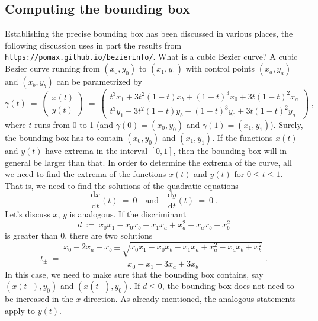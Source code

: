 \documentclass{article}
\begin{document}
\clearpage
\subsection*{Computing the bounding box}

Establishing the precise bounding box has been discussed in various places, the
following discussion uses in part the results from
\texttt{https://pomax.github.io/bezierinfo/}. What is a cubic Bezier curve? A
cubic Bezier curve running from $(x_0,y_0)$ to $(x_1,y_1)$ with control points
$(x_a,y_a)$ and $(x_b,y_b)$ can be parametrized by
\begin{equation}
 \gamma(t)~=~
 \begin{pmatrix} x(t)\\ y(t) \end{pmatrix}~=~
 \begin{pmatrix}t^3 x_{1}+3 t^2 (1-t) x_{b}+(1-t)^3
   x_{0}+3 t (1-t)^2 x_{a}\\
   t^3 y_{1}+3
   t^2 (1-t) y_{b}+(1-t)^3 y_{0}+3 t (1-t)^2
   y_{a}\end{pmatrix}\;,
\end{equation}
where $t$ runs from 0 to 1 (and $\gamma(0)=(x_0,y_0)$ and
$\gamma(1)=(x_1,y_1)$). Surely, the bounding box has to contain
$(x_0,y_0)$ and $(x_1,y_1)$. If the functions $x(t)$ and $y(t)$ have extrema in
the interval $[0,1]$, then the bounding box will in general be larger than that.
In order to determine the extrema of the curve, all
we need to find the extrema of the functions $x(t)$ and $y(t)$ for $0\le t\le
1$. That is, we need to find the solutions of the quadratic equations
\begin{equation}
 \frac{\mathrm{d}x}{\mathrm{d}t}(t)~=~0\quad\text{and}\quad
 \frac{\mathrm{d}y}{\mathrm{d}t}(t)~=~0\;.
\end{equation}
Let's discuss $x$, $y$ is analogous. If the discriminant
\begin{equation}
 d~:=~x_{0} x_{1}-x_{0}
   x_{b}-x_{1}
   x_{a}+x_{a}^2-x_{a}
   x_{b}+x_{b}^2
\end{equation}
is greater than 0, there are two solutions
\begin{equation}
 t_\pm~=~\frac{x_{0}-2
   x_{a}+x_{b}\pm\sqrt{x_{0} x_{1}-x_{0}
   x_{b}-x_{1}
   x_{a}+x_{a}^2-x_{a}
   x_{b}+x_{b}^2}}{x_{0}-x_{1}-3
   x_{a}+3 x_{b}} \;.
\end{equation}   
In this case, we need to make sure that the bounding box contains, say
$(x(t_-),y_0)$ and $(x(t_+),y_0)$. If $d\le0$, the bounding box does not need to
be increased in the $x$ direction. As already mentioned, the analogous
statements apply to $y(t)$. 
\end{document}
